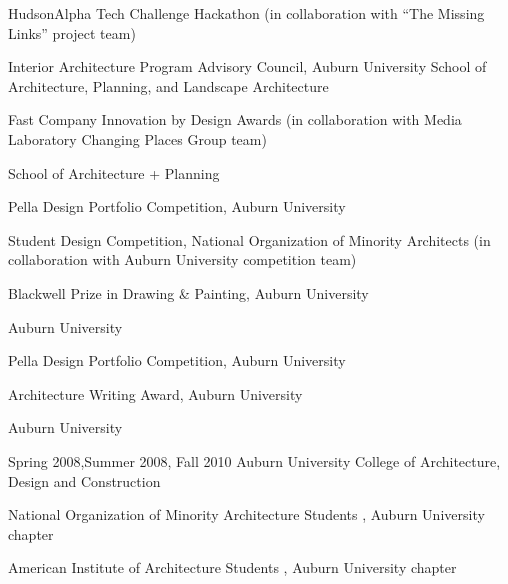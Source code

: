 \documentclass[letterpaper, oneside, 10pt]{article}
\begin{document}
\DotSep{0.25em}
HudsonAlpha Tech Challenge Hackathon (in collaboration with ``The Missing
Links'' project team)

\DotSep{0.25em} Interior Architecture
Program Advisory Council, Auburn University School of Architecture, Planning,
and Landscape Architecture  

\DotSep{0.25em} Fast Company Innovation
by Design Awards (in collaboration with  Media Laboratory Changing
Places Group team)

\DotSep{0.25em}  School of
Architecture + Planning 

\DotSep{0.25em} Pella Design Portfolio
Competition, Auburn University 

\DotSep{0.25em} Student Design Competition,
National Organization of Minority Architects (in collaboration with Auburn
University  competition team)

\hfill
\vspace{1.5pt}

\DotSep{0.25em} Blackwell Prize in Drawing \&
Painting, Auburn University 

\DotSep{0.25em} Auburn University 

\DotSep{0.25em} Pella Design Portfolio
Competition, Auburn University 

\DotSep{0.25em} Architecture Writing Award, Auburn
University 

\DotSep{0.25em}
Auburn University 

\DotSep{0.25em} Spring 2008,\enspace Summer 2008,\enspace
Fall 2010\DotSep{0.25em} Auburn University College of Architecture, Design and
Construction 

\DotSep{0.25em} National Organization of Minority
Architecture Students , Auburn University chapter

\DotSep{0.25em}
American Institute of Architecture Students , Auburn University
chapter
\end{document}
